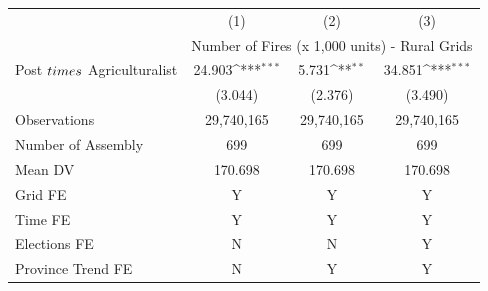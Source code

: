 {
\def\sym#1{\ifmmode^{#1}\else\(^{#1}\)\fi}
\begin{tabular}{l*{3}{c}}
\hline
            &\multicolumn{1}{c}{(1)}         &\multicolumn{1}{c}{(2)}         &\multicolumn{1}{c}{(3)}         \\
            & \multicolumn{3}{c}{Number of Fires (x 1,000 units) - Rural Grids} \\ \hline

Post $\\times$ Agriculturalist&      24.903\sym{***}&       5.731\sym{**} &      34.851\sym{***}\\
            &     (3.044)         &     (2.376)         &     (3.490)         \\
\hline
Observations&  29,740,165         &  29,740,165         &  29,740,165         \\
Number of Assembly&         699         &         699         &         699         \\
Mean DV     &     170.698         &     170.698         &     170.698         \\
Grid FE     &           Y         &           Y         &           Y         \\
Time FE     &           Y         &           Y         &           Y         \\
Elections FE&           N         &           N         &           Y         \\
Province Trend FE&           N         &           Y         &           Y         \\
\hline
\end{tabular}
}
